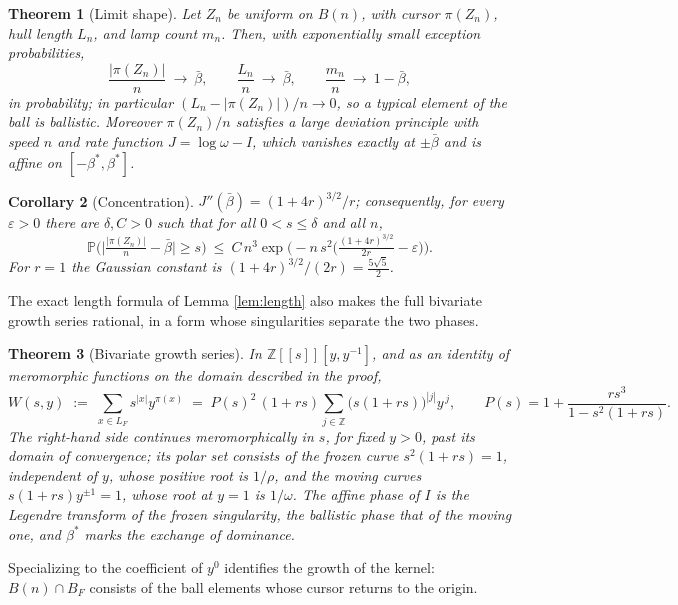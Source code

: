 \documentclass[11pt]{amsart}
\newtheorem{theorem}{Theorem}[section]
\newtheorem{corollary}[theorem]{Corollary}
\theoremstyle{definition}
\theoremstyle{remark}
\newcommand{\Z}{\mathbb{Z}}
\newcommand{\Prob}{\mathbb{P}}
\begin{document}
\begin{theorem}[Limit shape]\label{thm:shape}
Let $Z_n$ be uniform on $B(n)$, with cursor $\pi(Z_n)$, hull length $L_n$, and lamp count $m_n$. Then, with exponentially small exception probabilities,
\[
\frac{|\pi(Z_n)|}{n}\ \longrightarrow\ \bar\beta,
\qquad
\frac{L_n}{n}\ \longrightarrow\ \bar\beta,
\qquad
\frac{m_n}{n}\ \longrightarrow\ 1-\bar\beta ,
\]
in probability; in particular $(L_n-|\pi(Z_n)|)/n\to0$, so a typical element of the ball is ballistic. Moreover $\pi(Z_n)/n$ satisfies a large deviation principle with speed $n$ and rate function $J=\log\omega-I$, which vanishes exactly at $\pm\bar\beta$ and is affine on $[-\beta^{*},\beta^{*}]$.
\end{theorem}

\begin{corollary}[Concentration]\label{cor:concentration}
$J''(\bar\beta)=(1+4r)^{3/2}/r$; consequently, for every $\varepsilon>0$ there are $\delta,C>0$ such that for all $0<s\le\delta$ and all $n$,
\[
\Prob\Big(\Big|\tfrac{|\pi(Z_n)|}{n}-\bar\beta\Big|\ge s\Big)\ \le\ C\,n^{3}\exp\Big(-n\,s^{2}\Big(\tfrac{(1+4r)^{3/2}}{2r}-\varepsilon\Big)\Big).
\]
For $r=1$ the Gaussian constant is $(1+4r)^{3/2}/(2r)=\tfrac{5\sqrt5}{2}$.
\end{corollary}

The exact length formula of Lemma \ref{lem:length} also makes the full bivariate growth series rational, in a form whose singularities separate the two phases.

\begin{theorem}[Bivariate growth series]\label{thm:series}
In $\Z[[s]][y,y^{-1}]$, and as an identity of meromorphic functions on the domain described in the proof,
\[
W(s,y)\;:=\;\sum_{x\in L_F}s^{|x|}y^{\pi(x)}
\;=\;P(s)^{2}\,(1+rs)\sum_{j\in\Z}\big(s(1+rs)\big)^{|j|}y^{\,j},
\qquad
P(s)=1+\frac{r s^{3}}{1-s^{2}(1+rs)} .
\]
The right-hand side continues meromorphically in $s$, for fixed $y>0$, past its domain of convergence; its polar set consists of the \emph{frozen} curve $s^{2}(1+rs)=1$, independent of $y$, whose positive root is $1/\rho$, and the \emph{moving} curves $s(1+rs)y^{\pm1}=1$, whose root at $y=1$ is $1/\omega$. The affine phase of $I$ is the Legendre transform of the frozen singularity, the ballistic phase that of the moving one, and $\beta^{*}$ marks the exchange of dominance.
\end{theorem}

Specializing to the coefficient of $y^{0}$ identifies the growth of the kernel: $B(n)\cap B_F$ consists of the ball elements whose cursor returns to the origin.
\end{document}
